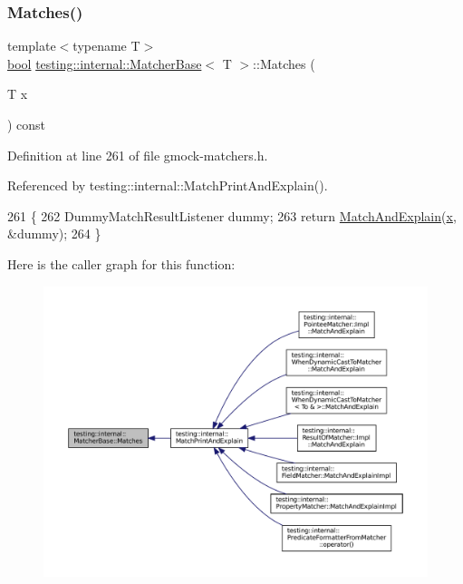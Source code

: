 \subsubsection{\texorpdfstring{Matches()}{Matches()}}
{\footnotesize\ttfamily template$<$typename T$>$ \\
\hyperlink{classbool}{bool} \hyperlink{classtesting_1_1internal_1_1MatcherBase}{testing\+::internal\+::\+Matcher\+Base}$<$ T $>$\+::Matches (\begin{DoxyParamCaption}\item[{T}]{x }\end{DoxyParamCaption}) const\hspace{0.3cm}{\ttfamily [inline]}}



Definition at line 261 of file gmock-\/matchers.\+h.



Referenced by testing\+::internal\+::\+Match\+Print\+And\+Explain().


\begin{DoxyCode}
261                           \{
262     DummyMatchResultListener dummy;
263     \textcolor{keywordflow}{return} \hyperlink{classtesting_1_1internal_1_1MatcherBase_a08429a6d7e7d330de4a4eb4e272105a7}{MatchAndExplain}(\hyperlink{namespaceinteractive__marker_acda52804aef30b460a72fb21ee01d69d}{x}, &dummy);
264   \}
\end{DoxyCode}
Here is the caller graph for this function\+:
\nopagebreak
\begin{figure}[H]
\begin{center}
\leavevmode
\includegraphics[width=350pt]{classtesting_1_1internal_1_1MatcherBase_a3b479673ff40cac1a7d548e91d789cb2_icgraph}
\end{center}
\end{figure}


